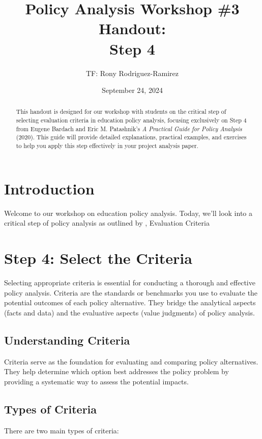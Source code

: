 \documentclass{article}
\title{Policy Analysis Workshop \#3 Handout:\\Step 4 }
\author{TF: Rony Rodriguez-Ramirez}
\date{September 24, 2024}
\theoremstyle{definition}
\theoremstyle{plain}
\begin{document}
\maketitle

\begin{abstract}
This handout is designed for our workshop with students on the critical step of
selecting evaluation criteria in education policy analysis, focusing exclusively
on Step 4 from Eugene Bardach and Eric M. Patashnik's \textit{A Practical Guide
for Policy Analysis} (2020). This guide will provide detailed explanations,
practical examples, and exercises to help you apply this step effectively in
your project analysis paper. 
\end{abstract}

\section{Introduction}

Welcome to our workshop on education policy analysis. Today, we'll look into a
critical step of policy analysis as outlined by \citet{Bardach2020}, Evaluation
Criteria

\section{Step 4: Select the Criteria}

Selecting appropriate criteria is essential for conducting a thorough and
effective policy analysis. Criteria are the standards or benchmarks you use to
evaluate the potential outcomes of each policy alternative. They bridge the
analytical aspects (facts and data) and the evaluative aspects (value judgments)
of policy analysis. 

\subsection{Understanding Criteria}

Criteria serve as the foundation for evaluating and comparing policy
alternatives. They help determine which option best addresses the policy problem
by providing a systematic way to assess the potential impacts. 

\subsection{Types of Criteria}

There are two main types of criteria:
\end{document}
